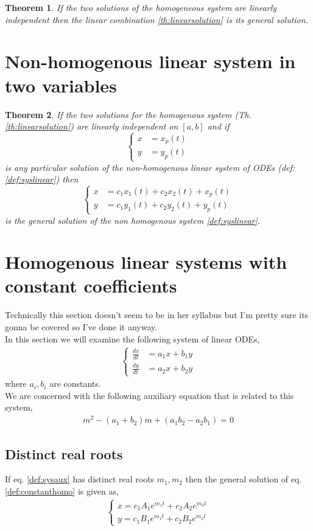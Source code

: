 \documentclass[oneside,11pt,pdftex,final]{book}%
\numberwithin{equation}{section}
\newtheorem{theorem}{Theorem}[chapter]%
\numberwithin{section}{chapter}
\numberwithin{equation}{chapter}
\begin{document}
\begin{theorem}
	If the two solutions of the homogeneous system are linearly independent then the linear combination \ref{th:linearsolution} is its general solution.
\end{theorem}


\section{Non-homogenous linear system in two variables}
\begin{theorem}
	If the two solutions for the homogenous system (Th. \ref{th:linearsolution}) are linearly independent on $ [a,b] $ and if 
	\[ \begin{cases}
		x&=x_p(t)\\
		y&=y_p(t)
	\end{cases} \]
	is any particular solution of the non-homogenous linear system of ODEs (def: \ref{def:syslinear}) then 
	\[ \begin{cases}
		x&=c_1x_1(t)+c_2x_2(t)+x_p(t)\\
		y&=c_1y_1(t)+c_2y_2(t)+y_p(t)
	\end{cases} \]
is the general solution of the non homogenous system \ref{def:syslinear}.
\end{theorem}

\section{Homogenous linear systems with constant coefficients}
Technically this section doesn't seem to be in her syllabus but I'm pretty sure its gonna be covered so I've done it anyway.\\
In this section we will examine the following system of linear ODEs,
\begin{align}\label{def:constanthomo}
	\begin{cases}
		\frac{dx}{dt}&=a_1x+b_1y\\
		\frac{dy}{dt}&=a_2x+b_2y
	\end{cases}
\end{align}
where $ a_i,b_i $ are constants.\\
We are concerned with the following auxiliary equation that is related to this system,
\begin{align}\label{def:sysaux}
	m^2-(a_1+b_2)m+(a_1b_2-a_2b_1)=0
\end{align}


\subsection{Distinct real roots}
If eq. \ref{def:sysaux} has distinct real roots $ m_1, m_2 $ then the general solution of eq. \ref{def:constanthomo} is given as,
\begin{align*}
	\begin{cases}
		x=c_1A_1e^{m_1t}+c_2A_2e^{m_2t}\\
		y=c_1B_1e^{m_1t}+c_2B_2e^{m_2t}
	\end{cases}
\end{align*}
\end{document}
